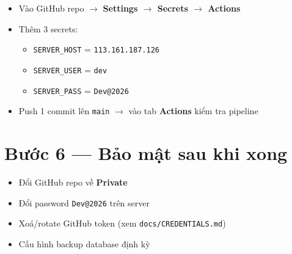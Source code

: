 \documentclass[12pt, a4paper]{article}
\begin{document}
\begin{itemize}[label=\Square]
  \item Vào GitHub repo $\to$ \textbf{Settings $\to$ Secrets $\to$ Actions}
  \item Thêm 3 secrets:
    \begin{itemize}
      \item \texttt{SERVER\_HOST} = \texttt{113.161.187.126}
      \item \texttt{SERVER\_USER} = \texttt{dev}
      \item \texttt{SERVER\_PASS} = \texttt{Dev@2026}
    \end{itemize}
  \item Push 1 commit lên \texttt{main} $\to$ vào tab \textbf{Actions} kiểm tra pipeline
\end{itemize}

\section{Bước 6 — Bảo mật sau khi xong}

\begin{itemize}[label=\Square]
  \item Đổi GitHub repo về \textbf{Private}
  \item Đổi password \texttt{Dev@2026} trên server
  \item Xoá/rotate GitHub token (xem \texttt{docs/CREDENTIALS.md})
  \item Cấu hình backup database định kỳ
\end{itemize}
\end{document}
